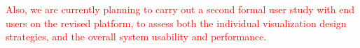 \textcolor{red}{Also, we are currently planning to carry out a second formal user study with end users on the revised platform, to assess both the individual visualization design strategies, and the overall system usability and performance.} 


